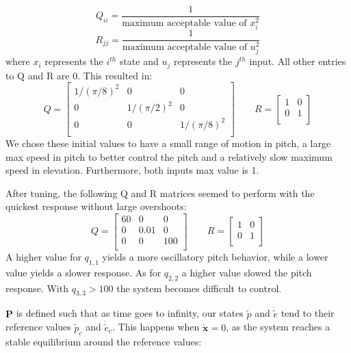 \begin{equation}
  Q_{ii} = \frac{1}{\text{maximum acceptable value of }x_i^2}
\end{equation}
\begin{equation}
  R_{jj} = \frac{1}{\text{maximum acceptable value of }u_j^2}
\end{equation}
where $x_i$ represents the $i^{th}$ state and $u_j$ represents the
$j^{th}$ input. All other entries to Q and R are 0. This resulted
in: \begin{equation}
  Q =
  \begin{bmatrix}
    1/(\pi/8)^2 & 0          & 0 \\
    0 &          1/(\pi/2)^2 & 0 \\
    0 &          0          & 1/(\pi/8)^2 \\
  \end{bmatrix}
  \qquad
  R =
  \begin{bmatrix}
    1 & 0 \\
    0 & 1 \\
  \end{bmatrix}
\end{equation}
We chose these initial values to have a small range of motion in
pitch, a large max speed in pitch to better control the pitch and a
relatively slow maximum speed in elevation. Furthermore, both inputs
max value is 1.

After tuning, the following Q and R matrices seemed to perform with
the quickest response without large overshoots:
\begin{equation}
  Q =
  \begin{bmatrix}
    60 & 0   & 0 \\
    0  & 0.01 & 0 \\
    0  & 0   & 100 \\
  \end{bmatrix}
  \qquad
  R =
  \begin{bmatrix}
    1 & 0 \\
    0 & 1 \\
  \end{bmatrix}
\end{equation}
A higher value for $q_{1,1}$ yields a more oscillatory pitch behavior,
while a lower value yields a slower response. As for $q_{2,2}$ a
higher value slowed the pitch response. With $q_{3,3} > 100$ the
system becomes difficult to control.

$\boldsymbol{P}$ is defined such that as time goes to infinity, our
states $\tilde{p}$ and $\dot{\tilde{e}}$ tend to their reference
values $\tilde{p}_c$ and $\dot{\tilde{e}}_c$. This happens when
$\dot{\boldsymbol{x}} = 0$, as the system reaches a stable equilibrium
around the reference values:


